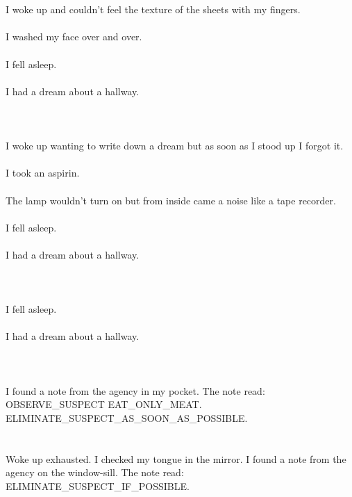 \documentclass{article}
\begin{document}
    \section{}
    I woke up and couldn't feel the texture of the sheets with my fingers.\\\\I washed my face over and over.\\\\I fell asleep.\\\\I had a dream about a hallway.\\\\ 
    \newpage
    
    \section{}
    I woke up wanting to write down a dream but as soon as I stood up I forgot it.\\\\I took an aspirin.\\\\The lamp wouldn't turn on but from inside came a noise like a tape recorder.\\\\I fell asleep.\\\\I had a dream about a hallway.\\\\ 
    \newpage
    
    \section{}
    I fell asleep.\\\\I had a dream about a hallway.\\\\ 
    \newpage
    
    \section{}
    I found a note from the agency in my pocket. The note read: OBSERVE_SUSPECT EAT_ONLY_MEAT. ELIMINATE_SUSPECT_AS_SOON_AS_POSSIBLE.  
    \newpage
    
    \section{}
    Woke up exhausted. I checked my tongue in the mirror. I found a note from the agency on the window-sill. The note read: ELIMINATE_SUSPECT_IF_POSSIBLE.  
    \newpage
    
\end{document}

